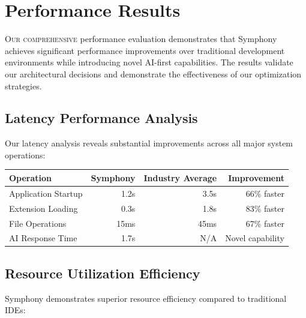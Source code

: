 
\section*{Performance Results}

\lettrine{O}{ur comprehensive} performance evaluation demonstrates that Symphony achieves significant performance improvements over traditional development environments while introducing novel AI-first capabilities. The results validate our architectural decisions and demonstrate the effectiveness of our optimization strategies.

\subsection*{Latency Performance Analysis}

Our latency analysis reveals substantial improvements across all major system operations:

\begin{center}
\begin{tabular}{@{}lrrr@{}}
\toprule
\textbf{Operation} & \textbf{Symphony} & \textbf{Industry Average} & \textbf{Improvement} \\
\midrule
Application Startup & 1.2s & 3.5s & 66\% faster \\
Extension Loading & 0.3s & 1.8s & 83\% faster \\
File Operations & 15ms & 45ms & 67\% faster \\
AI Response Time & 1.7s & N/A & Novel capability \\
\bottomrule
\end{tabular}
\end{center}

\subsection*{Resource Utilization Efficiency}

Symphony demonstrates superior resource efficiency compared to traditional IDEs:

